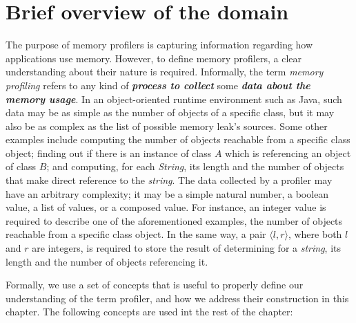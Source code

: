 
\section{Brief overview of the domain} \label{sec:domain-overview}

The purpose of memory profilers is capturing information regarding how applications use memory.
However, to define memory profilers, a clear understanding about their nature is required.
Informally, the term \textit{memory profiling} refers to any kind of \textbf{\textit{process to collect}} some \textbf{\textit{data about the memory usage}}.
In an object-oriented runtime environment such as Java, such data may be as simple as the number of objects of a specific class, but it may also be as complex as the list of possible memory leak's sources.
Some other examples include computing the number of objects reachable from a specific class object; finding out if there is an instance of class $A$ which is referencing an object of class $B$; and computing, for each \textit{String}, its length and the number of objects that make direct reference to the \textit{string}.
The data collected by a profiler may have an arbitrary complexity; it may be a simple natural number, a boolean value, a list of values, or a composed value.
For instance, an integer value is required to describe one of the aforementioned examples, the number of objects reachable from a specific class object.
In the same way, a pair $\langle l,r \rangle$, where both $l$ and $r$ are integers, is required to store the result of determining for a \textit{string}, its length and the number of objects referencing it.


Formally, we use a set of concepts that is useful to properly define our understanding of the term profiler, and how we address their construction in this chapter.
The following concepts are used int the rest of the chapter:

